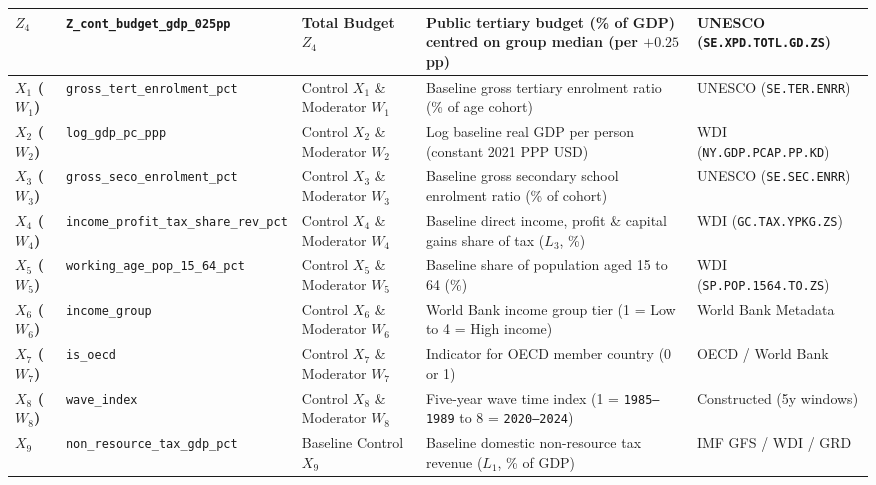 \documentclass[11pt,a4paper]{article}
\newcommand{\co}{\cellcolor{colodd}}
\newcommand{\ce}{\cellcolor{coleven}}
\begin{document}
\begin{table}[htbp]
{\begin{tabular}{l|l|l|l|l}
    \rowcolor{roweven}
    \textbf{$Z_4$} & \ce \texttt{Z\_cont\_budget\_gdp\_025pp} & Total Budget $Z_4$ & \ce Public tertiary budget (\% of GDP) centred on group median (per $+0.25$ pp) & UNESCO (\texttt{SE.XPD.TOTL.GD.ZS}) \\
    \hline
    \rowcolor{rowodd}
    \textbf{$X_1$ ($W_1$)} & \co \texttt{gross\_tert\_enrolment\_pct} & Control $X_1$ \& Moderator $W_1$ & \co Baseline gross tertiary enrolment ratio (\% of age cohort) & UNESCO (\texttt{SE.TER.ENRR}) \\
    \rowcolor{roweven}
    \textbf{$X_2$ ($W_2$)} & \ce \texttt{log\_gdp\_pc\_ppp} & Control $X_2$ \& Moderator $W_2$ & \ce Log baseline real GDP per person (constant 2021 PPP USD) & WDI (\texttt{NY.GDP.PCAP.PP.KD}) \\
    \rowcolor{rowodd}
    \textbf{$X_3$ ($W_3$)} & \co \texttt{gross\_seco\_enrolment\_pct} & Control $X_3$ \& Moderator $W_3$ & \co Baseline gross secondary school enrolment ratio (\% of cohort) & UNESCO (\texttt{SE.SEC.ENRR}) \\
    \rowcolor{roweven}
    \textbf{$X_4$ ($W_4$)} & \ce \texttt{income\_profit\_tax\_share\_rev\_pct} & Control $X_4$ \& Moderator $W_4$ & \ce Baseline direct income, profit \& capital gains share of tax ($L_3$, \%) & WDI (\texttt{GC.TAX.YPKG.ZS}) \\
    \rowcolor{rowodd}
    \textbf{$X_5$ ($W_5$)} & \co \texttt{working\_age\_pop\_15\_64\_pct} & Control $X_5$ \& Moderator $W_5$ & \co Baseline share of population aged 15 to 64 (\%) & WDI (\texttt{SP.POP.1564.TO.ZS}) \\
    \rowcolor{roweven}
    \textbf{$X_6$ ($W_6$)} & \ce \texttt{income\_group} & Control $X_6$ \& Moderator $W_6$ & \ce World Bank income group tier (1 = Low to 4 = High income) & World Bank Metadata \\
    \rowcolor{rowodd}
    \textbf{$X_7$ ($W_7$)} & \co \texttt{is\_oecd} & Control $X_7$ \& Moderator $W_7$ & \co Indicator for OECD member country (0 or 1) & OECD / World Bank \\
    \rowcolor{roweven}
    \textbf{$X_8$ ($W_8$)} & \ce \texttt{wave\_index} & Control $X_8$ \& Moderator $W_8$ & \ce Five-year wave time index (1 = \texttt{1985--1989} to 8 = \texttt{2020--2024}) & Constructed (5y windows) \\
    \rowcolor{rowodd}
    \textbf{$X_9$} & \co \texttt{non\_resource\_tax\_gdp\_pct} & Baseline Control $X_9$ & \co Baseline domestic non-resource tax revenue ($L_1$, \% of GDP) & IMF GFS / WDI / GRD \\

\end{tabular}}
\end{table}
\end{document}
